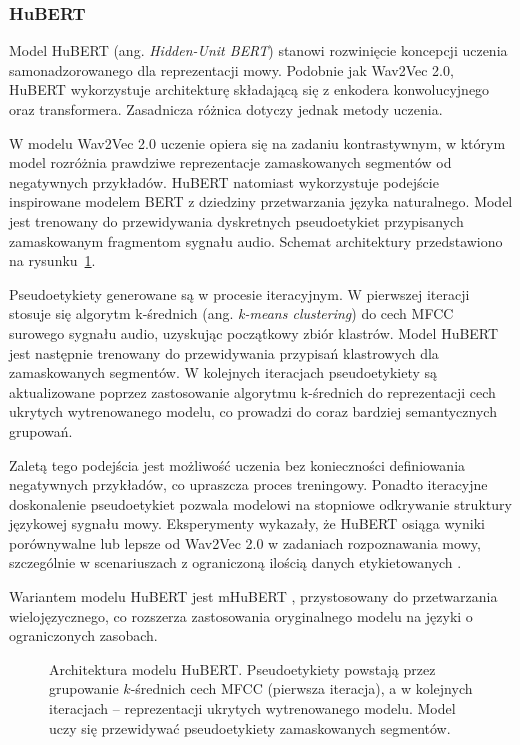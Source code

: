 \subsubsection{HuBERT}

Model HuBERT (ang. \textit{Hidden-Unit BERT}) \cite{hsu2021hubert} stanowi rozwinięcie koncepcji uczenia samonadzorowanego dla reprezentacji mowy. Podobnie jak Wav2Vec 2.0, HuBERT wykorzystuje architekturę składającą się z enkodera konwolucyjnego oraz transformera. Zasadnicza różnica dotyczy jednak metody uczenia.

W modelu Wav2Vec 2.0 uczenie opiera się na zadaniu kontrastywnym, w którym model rozróżnia prawdziwe reprezentacje zamaskowanych segmentów od negatywnych przykładów. HuBERT natomiast wykorzystuje podejście inspirowane modelem BERT \cite{devlin2019bert} z dziedziny przetwarzania języka naturalnego. Model jest trenowany do przewidywania dyskretnych pseudoetykiet przypisanych zamaskowanym fragmentom sygnału audio. Schemat architektury przedstawiono na rysunku~\ref{fig:hubertArchitecture}.

Pseudoetykiety generowane są w procesie iteracyjnym. W pierwszej iteracji stosuje się algorytm k-średnich (ang. \textit{k-means clustering}) do cech MFCC surowego sygnału audio, uzyskując początkowy zbiór klastrów. Model HuBERT jest następnie trenowany do przewidywania przypisań klastrowych dla zamaskowanych segmentów. W kolejnych iteracjach pseudoetykiety są aktualizowane poprzez zastosowanie algorytmu k-średnich do reprezentacji cech ukrytych wytrenowanego modelu, co prowadzi do coraz bardziej semantycznych grupowań.

Zaletą tego podejścia jest możliwość uczenia bez konieczności definiowania negatywnych przykładów, co upraszcza proces treningowy. Ponadto iteracyjne doskonalenie pseudoetykiet pozwala modelowi na stopniowe odkrywanie struktury językowej sygnału mowy. Eksperymenty wykazały, że HuBERT osiąga wyniki porównywalne lub lepsze od Wav2Vec 2.0 w zadaniach rozpoznawania mowy, szczególnie w scenariuszach z ograniczoną ilością danych etykietowanych \cite{hsu2021hubert}.

Wariantem modelu HuBERT jest mHuBERT \cite{mhubert}, przystosowany do przetwarzania wielojęzycznego, co rozszerza zastosowania oryginalnego modelu na języki o ograniczonych zasobach.

\begin{figure}[htbp]
    \centering
    \caption{Architektura modelu HuBERT. Pseudoetykiety powstają przez grupowanie $k$-średnich cech MFCC (pierwsza iteracja), a w kolejnych iteracjach -- reprezentacji ukrytych wytrenowanego modelu. Model uczy się przewidywać pseudoetykiety zamaskowanych segmentów.}
    \label{fig:hubertArchitecture}
\end{figure}

